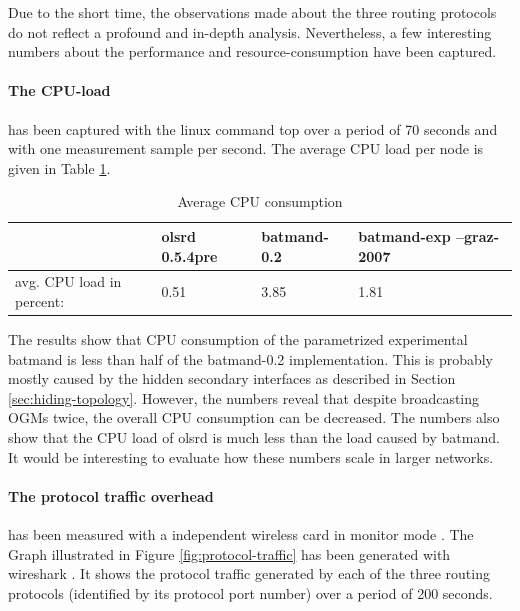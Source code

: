 \documentclass[11pt]{article}
\begin{document}
Due to the short time, the observations made about the three routing protocols do not reflect a profound and in-depth analysis. Nevertheless, a few interesting numbers about the performance and resource-consumption have been captured.

\paragraph{The CPU-load} has been captured with the linux command top over a period of 70 seconds and with one measurement sample per second. The average CPU load per node is given in Table \ref{tab:cpu-load}.




\begin{table}[htb]
\begin{center}
\begin{tabular}{|l||l|l|l|}
\hline
&olsrd 0.5.4pre & batmand-0.2 & batmand-exp --graz-2007 \\
\hline
avg. CPU load in percent: & 0.51 & 3.85 & 1.81 \\
\hline
\end{tabular}
\caption{Average CPU consumption}
\label{tab:cpu-load}
\end{center}
\end{table}%

The results show that CPU consumption of the parametrized experimental batmand is less than half of the batmand-0.2 implementation. This is probably mostly caused by the hidden secondary interfaces as described in Section \ref{sec:hiding-topology}.
%
However, the numbers reveal that despite broadcasting OGMs twice, the overall CPU consumption can be decreased.
The numbers also show that the CPU load of olsrd is much less than the load caused by batmand. 
It would be interesting to evaluate how these numbers scale in larger networks.


\paragraph{The protocol traffic overhead} has been measured with a independent wireless card in monitor mode . The Graph illustrated in Figure \ref{fig:protocol-traffic} has been generated with wireshark \cite{wireshark}.
It shows the protocol traffic generated by each of the three routing protocols (identified by its protocol port number) over a period of 200 seconds.
\end{document}
